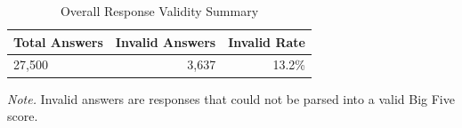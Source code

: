 \begin{table}[htbp]
\begin{threeparttable}
\caption{Overall Response Validity Summary}
\label{tab:overall_summary}
\centering
\begin{tabular}{lrr}
\toprule
Total Answers & Invalid Answers & Invalid Rate \\
\midrule
  27,500 & 3,637 & 13.2\% \\
\bottomrule
\end{tabular}
\begin{tablenotes}
\footnotesize
\item \textit{Note.} Invalid answers are responses that could not be parsed into a valid Big Five score.
\end{tablenotes}
\end{threeparttable}
\end{table}